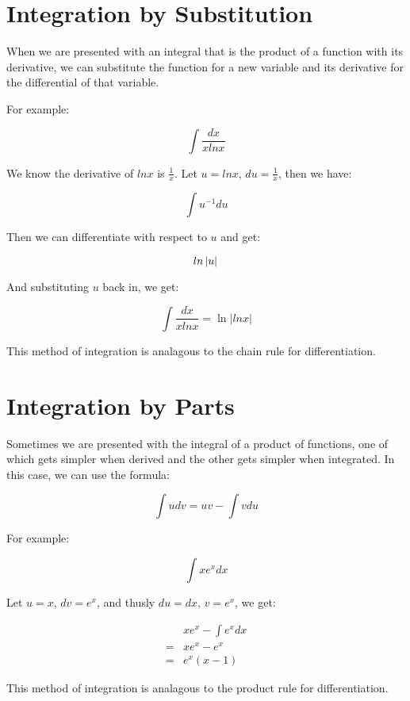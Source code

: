 \documentclass{article}
\begin{document}
\newpage
\section{Integration by Substitution}

When we are presented with an integral that is the product of a
function with its derivative, we can substitute the function for a new
variable and its derivative for the differential of that variable.

For example:

\[
\int \frac{dx}{xlnx}
\]

We know the derivative of $lnx$ is $\frac{1}{x}$.  Let $u=lnx$,
$du=\frac{1}{x}$, then we have:

\[
\int u^{-1}du
\]

Then we can differentiate with respect to $u$ and get:

\[
ln \left| u \right| \\
\]

And substituting $u$ back in, we get:

\[
\int \frac{dx}{xlnx} = \ln \left| lnx \right|
\]

This method of integration is analagous to the chain rule for
differentiation.

\newpage
\section{Integration by Parts}

Sometimes we are presented with the integral of a product of
functions, one of which gets simpler when derived and the other gets
simpler when integrated.  In this case, we can use the formula:

\[
\int udv = uv - \int vdu
\]

For example:

\[
\int xe^xdx
\]

Let $u = x$, $dv = e^x$, and thusly $du = dx$, $v = e^x$, we get:

\begin{align*}
  &xe^x - \int e^xdx \\
  = &xe^x - e^x \\
  = &e^x(x-1)
\end{align*}

This method of integration is analagous to the product rule for
differentiation.
\end{document}
